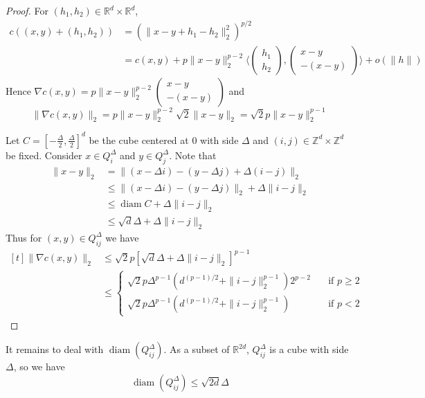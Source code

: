 \documentclass[12pt]{report}
\theoremstyle{definition}
\theoremstyle{remark}
\DeclareMathOperator*{\diam}{diam}
\begin{document}
\begin{proof}
For $(h_1,h_2)\in \mathbb R^d\times \mathbb R^d$, 
$$\begin{aligned}
c((x,y)+(h_1,h_2)) &= (\|x-y+h_1-h_2\|_2^2)^{p/2}\\
&= c(x,y) + p\|x-y\|_2^{p-2}\langle \begin{pmatrix}h_1\\h_2\end{pmatrix}, \begin{pmatrix}x-y\\-(x-y)\end{pmatrix} \rangle +o(\|h\|)
\end{aligned}$$
Hence $\nabla c(x,y)= p\|x-y\|_2^{p-2} \begin{pmatrix}x-y\\-(x-y)\end{pmatrix}$ and $$\|\nabla c(x,y)\|_2 =  p\|x-y\|_2^{p-2} \sqrt 2 \|x-y\|_2 = \sqrt 2 p\|x-y\|_2^{p-1}$$

\noindent Let $C=\left[-\frac \Delta2,\frac \Delta2\right]^d$ be the cube centered at $0$ with side $\Delta$ and $(i,j)\in \mathbb Z^d \times \mathbb Z^d$ be fixed. Consider $x\in Q_{i}^{\Delta}$ and $y\in Q_{j}^{\Delta}$.  Note that $$\begin{aligned}
\|x-y\|_2 &= \|(x-\Delta i) - (y-\Delta j) +\Delta(i-j)\|_2 \\
&\leq \|(x-\Delta i) - (y-\Delta j)\|_2 + \Delta \|i-j\|_2\\
&\leq \diam C + \Delta \|i-j\|_2\\
&\leq \sqrt d \Delta + \Delta \|i-j\|_2
\end{aligned}$$
Thus for $(x,y)\in Q_{ij}^{\Delta}$ we have $\begin{aligned}[t]
\|\nabla c(x,y)\|_2 &\leq \sqrt 2 p [\sqrt d \Delta + \Delta \|i-j\|_2]^{p-1} \\
&\leq 
\begin{cases}
\sqrt 2 p \Delta^{p-1}(d^{(p-1)/2}  + \|i-j\|_2^{p-1})2^{p-2} \quad &\text{if } p\geq 2 \\
\sqrt 2 p \Delta^{p-1}(d^{(p-1)/2}  + \|i-j\|_2^{p-1}) \quad &\text{if } p<2
\end{cases}
\end{aligned}$
\hfill\\
\end{proof}

It remains to deal with $\diam(Q_{ij}^{\Delta})$. As a subset of $\mathbb R^{2d}$, $Q_{ij}^{\Delta}$ is a cube with side $\Delta$, so we have  $$\diam(Q_{ij}^{\Delta})\leq \sqrt{2d}\Delta$$
\end{document}
